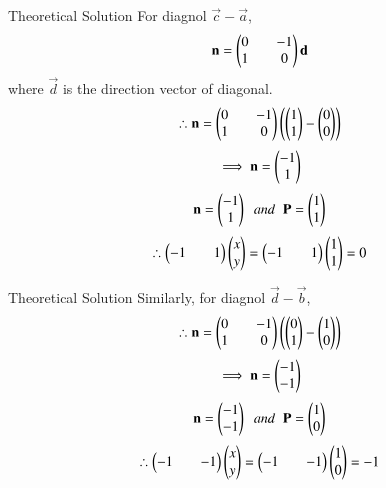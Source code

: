 \documentclass{beamer}
\begin{document}
\begin{frame}{Theoretical Solution}
For diagnol $\vec{c}-\vec{a}$,
\begin{align*}
    \mathbf{n}=\begin{pmatrix}0&&-1\\1&&0\end{pmatrix}\mathbf{d}
\end{align*}
where $\vec{d}$ is the direction vector of diagonal.
\begin{align*}
    \therefore \mathbf{n}=\begin{pmatrix}0&&-1\\1&&0\end{pmatrix}\left(\begin{pmatrix}1\\1\end{pmatrix}-\begin{pmatrix}0\\0\end{pmatrix}\right)
\end{align*}
\begin{align*}
    \implies \mathbf{n}=\begin{pmatrix}-1\\1\end{pmatrix}
\end{align*}
\begin{align*}
    \mathbf{n}=\begin{pmatrix}-1\\1\end{pmatrix}\;\;and\;\;\mathbf{P}=\begin{pmatrix}1\\1\end{pmatrix}
\end{align*}
\begin{align*}
    \therefore \begin{pmatrix}-1&&1\end{pmatrix}\begin{pmatrix}x\\y\end{pmatrix}=\begin{pmatrix}-1&&1\end{pmatrix}\begin{pmatrix}1\\1\end{pmatrix}=0
\end{align*}
\end{frame}

\begin{frame}{Theoretical Solution}
Similarly, for diagnol $\vec{d}-\vec{b}$,
\begin{align*}
    \therefore \mathbf{n}=\begin{pmatrix}0&&-1\\1&&0\end{pmatrix}\left(\begin{pmatrix}0\\1\end{pmatrix}-\begin{pmatrix}1\\0\end{pmatrix}\right)
\end{align*}
\begin{align*}
    \implies \mathbf{n}=\begin{pmatrix}-1\\-1\end{pmatrix}
\end{align*}
\begin{align*}
    \mathbf{n}=\begin{pmatrix}-1\\-1\end{pmatrix}\;\;and\;\;\mathbf{P}=\begin{pmatrix}1\\0\end{pmatrix}
\end{align*}
\begin{align*}
    \therefore \begin{pmatrix}-1&&-1\end{pmatrix}\begin{pmatrix}x\\y\end{pmatrix}=\begin{pmatrix}-1&&-1\end{pmatrix}\begin{pmatrix}1\\0\end{pmatrix}=-1
\end{align*}
\end{frame}
\end{document}
